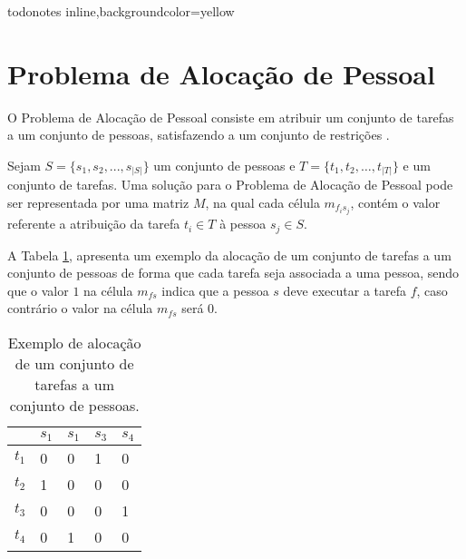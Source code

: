 
\presetkeys%
    {todonotes}%
    {inline,backgroundcolor=yellow}{}


\section{Problema de Alocação de Pessoal}

O Problema de Alocação de Pessoal consiste em atribuir um conjunto de tarefas a um conjunto de pessoas, satisfazendo a um conjunto de restrições \cite{blochiger:2003}.


Sejam $S = \{s_1,s_ 2, ..., s_{|S|}\}$  um conjunto de pessoas e $T = \{t_1, t_2, \ldots, t_{|T|}\}$ e um conjunto de tarefas. Uma solução para o Problema de Alocação de Pessoal pode ser representada por uma matriz $M$, na qual cada célula $m_{f_is_j}$, contém o valor referente a atribuição da tarefa $t_i \in T$ à pessoa $s_j \in S$.

A Tabela \ref{time_table_block}, apresenta um exemplo da alocação de um conjunto de tarefas a um conjunto de pessoas de forma que cada tarefa seja associada a uma pessoa, sendo que o valor $1$ na célula $m_{fs}$ indica que a pessoa $s$ deve executar a tarefa $f$, caso contrário o valor na célula $m_{fs}$ será 0.

\begin{table}[h]
\centering
\caption{Exemplo de alocação de um conjunto de tarefas a um conjunto de pessoas. \label{time_table_block}} 
\begin{tabular}{r|l|l|l|l}
   & $s_1$ & $s_1$ & $s_3$ & $s_4$ \\ \hline
$t_1$ & 0  & 0  & 1  & 0  \\ \hline
$t_2$ & 1  & 0  & 0  & 0  \\ \hline
$t_3$ & 0  & 0  & 0  & 1  \\ \hline
$t_4$ & 0  & 1  & 0  & 0 
\end{tabular}
\end{table}

